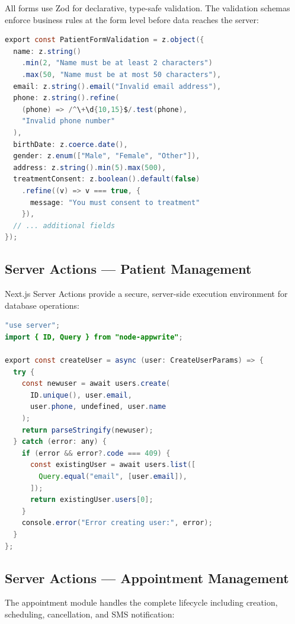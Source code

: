 \documentclass[11pt,a4paper]{article}
\begin{document}
All forms use Zod for declarative, type-safe validation. The validation schemas enforce business rules at the form level before data reaches the server:

\begin{lstlisting}[language=Java, caption={Patient Registration Validation Schema}]
export const PatientFormValidation = z.object({
  name: z.string()
    .min(2, "Name must be at least 2 characters")
    .max(50, "Name must be at most 50 characters"),
  email: z.string().email("Invalid email address"),
  phone: z.string().refine(
    (phone) => /^\+\d{10,15}$/.test(phone),
    "Invalid phone number"
  ),
  birthDate: z.coerce.date(),
  gender: z.enum(["Male", "Female", "Other"]),
  address: z.string().min(5).max(500),
  treatmentConsent: z.boolean().default(false)
    .refine((v) => v === true, {
      message: "You must consent to treatment"
    }),
  // ... additional fields
});
\end{lstlisting}

\subsection{Server Actions --- Patient Management}

Next.js Server Actions provide a secure, server-side execution environment for database operations:

\begin{lstlisting}[language=Java, caption={User Creation Server Action (patient.actions.ts)}]
"use server";
import { ID, Query } from "node-appwrite";

export const createUser = async (user: CreateUserParams) => {
  try {
    const newuser = await users.create(
      ID.unique(), user.email,
      user.phone, undefined, user.name
    );
    return parseStringify(newuser);
  } catch (error: any) {
    if (error && error?.code === 409) {
      const existingUser = await users.list([
        Query.equal("email", [user.email]),
      ]);
      return existingUser.users[0];
    }
    console.error("Error creating user:", error);
  }
};
\end{lstlisting}

\subsection{Server Actions --- Appointment Management}

The appointment module handles the complete lifecycle including creation, scheduling, cancellation, and SMS notification:
\end{document}
